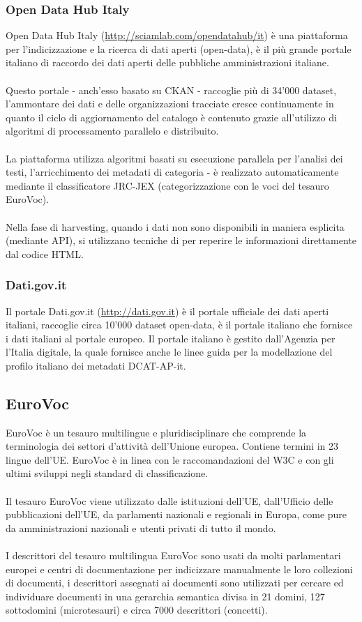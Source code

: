 \documentclass{article}
\theoremstyle{plain}
\theoremstyle{definition}
\begin{document}
\subsubsection{Open Data Hub Italy}
Open Data Hub Italy (\url{http://sciamlab.com/opendatahub/it}) è una piattaforma per l'indicizzazione e la ricerca di dati aperti (open-data), è il più grande portale italiano di raccordo dei dati aperti delle pubbliche amministrazioni italiane. 
\\
\\
Questo portale - anch'esso basato su CKAN - raccoglie più di 34'000 dataset, l'ammontare dei dati e delle organizzazioni tracciate cresce continuamente in quanto il ciclo di aggiornamento del catalogo è contenuto grazie all'utilizzo di algoritmi di processamento parallelo e distribuito.
\\
\\
La piattaforma utilizza algoritmi basati su esecuzione parallela per l'analisi dei testi, l'arricchimento dei metadati di categoria - è realizzato automaticamente mediante il classificatore JRC-JEX (categorizzazione con le voci del tesauro EuroVoc).
\\
\\
Nella fase di harvesting, quando i dati non sono disponibili in maniera esplicita (mediante API), si utilizzano tecniche di  per reperire le informazioni direttamente dal codice HTML.
\subsubsection{Dati.gov.it}
Il portale Dati.gov.it (\url{http://dati.gov.it}) è il portale ufficiale dei dati aperti italiani, raccoglie circa 10'000 dataset open-data, è il portale italiano che fornisce i dati italiani al portale europeo. Il portale italiano è gestito dall'Agenzia per l'Italia digitale, la quale fornisce anche le linee guida per la modellazione del profilo italiano dei metadati DCAT-AP-it.

\subsection{EuroVoc}
EuroVoc è un tesauro multilingue e pluridisciplinare che comprende la terminologia dei settori d'attività dell'Unione europea. Contiene termini in 23 lingue dell'UE. EuroVoc è in linea con le raccomandazioni del W3C e con gli ultimi sviluppi negli standard di classificazione. 
\\
\\
Il tesauro EuroVoc viene utilizzato dalle istituzioni dell'UE, dall'Ufficio delle pubblicazioni dell'UE, da parlamenti nazionali e regionali in Europa, come pure da amministrazioni nazionali e utenti privati di tutto il mondo.
\footnotemark
{}
\\
\\
I descrittori del tesauro multilingua EuroVoc sono usati da molti parlamentari europei e centri di documentazione per indicizzare manualmente le loro collezioni di documenti, i descrittori assegnati ai documenti sono utilizzati per cercare ed individuare documenti in una gerarchia semantica divisa in 21 domini, 127 sottodomini (microtesauri) e circa 7000 descrittori (concetti).
\newpage
\end{document}
